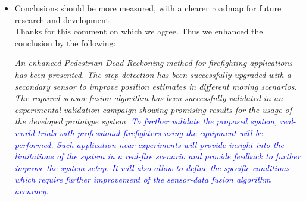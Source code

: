 \documentclass{article}
\begin{document}
\begin{itemize}
\item Conclusions should be more measured, with a clearer roadmap for future research and development.\\

Thanks for this comment on which we agree. Thus we enhanced the conclusion by the following:

\textit{An enhanced Pedestrian Dead Reckoning method for firefighting applications has been presented. The step-detection  has been successfully upgraded with a secondary sensor to improve  position estimates in different moving scenarios. The required sensor fusion algorithm has been successfully  validated in an experimental validation campaign showing promising results for the usage of the developed prototype system.  \textcolor{blue}{To further validate the proposed  system, real-world trials with professional firefighters using the equipment will  be performed. Such application-near experiments will provide insight into the limitations of the system in a real-fire scenario and provide feedback to further improve the system setup. It will also allow to define the specific conditions which require further improvement of the sensor-data fusion algorithm accuracy.}}



\end{itemize}





\end{document}
